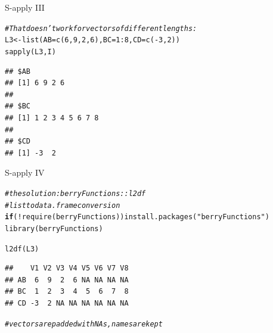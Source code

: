 \documentclass[xcolor=table,       handout,    xcolor=dvipsnames]{beamer}\usepackage[]{graphicx}\usepackage[]{color}
\makeatletter
\newcommand{\hlnum}[1]{\textcolor[rgb]{0,0,0}{#1}}
\newcommand{\hlstr}[1]{\textcolor[rgb]{0.545,0.137,0.137}{#1}}
\newcommand{\hlcom}[1]{\textcolor[rgb]{0,0.392,0}{\textit{#1}}}
\newcommand{\hlopt}[1]{\textcolor[rgb]{0,0,0}{#1}}
\newcommand{\hlstd}[1]{\textcolor[rgb]{0,0,0}{#1}}
\newcommand{\hlkwa}[1]{\textcolor[rgb]{1,0,0}{\textbf{#1}}}
\newcommand{\hlkwb}[1]{\textcolor[rgb]{0,0,0}{#1}}
\newcommand{\hlkwc}[1]{\textcolor[rgb]{1,0,1}{#1}}
\newcommand{\hlkwd}[1]{\textcolor[rgb]{0,0,1}{#1}}
\newenvironment{kframe}{%
 \def\at@end@of@kframe{}%
 \ifinner\ifhmode%
  \def\at@end@of@kframe{\end{minipage}}%
  \begin{minipage}{\columnwidth}%
 \fi\fi%
 \def\FrameCommand##1{\hskip\@totalleftmargin \hskip-\fboxsep
 \colorbox{shadecolor}{##1}\hskip-\fboxsep
     \hskip-\linewidth \hskip-\@totalleftmargin \hskip\columnwidth}%
 \MakeFramed {\advance\hsize-\width
   \@totalleftmargin\z@ \linewidth\hsize
   \@setminipage}}%
 {\par\unskip\endMakeFramed%
 \at@end@of@kframe}
\newenvironment{knitrout}{}{} %
\makeatother
\begin{document}
\begin{frame}[fragile]{S-apply III}
\begin{knitrout}
\color{fgcolor}\begin{kframe}
\begin{alltt}
\hlcom{# That doesn't work for vectors of different lengths:}
\hlstd{L3} \hlkwb{<-} \hlkwd{list}\hlstd{(}\hlkwc{AB}\hlstd{=}\hlkwd{c}\hlstd{(}\hlnum{6}\hlstd{,}\hlnum{9}\hlstd{,}\hlnum{2}\hlstd{,}\hlnum{6}\hlstd{),} \hlkwc{BC}\hlstd{=}\hlnum{1}\hlopt{:}\hlnum{8}\hlstd{,} \hlkwc{CD}\hlstd{=}\hlkwd{c}\hlstd{(}\hlopt{-}\hlnum{3}\hlstd{,}\hlnum{2}\hlstd{) )}
\hlkwd{sapply}\hlstd{(L3, I)}
\end{alltt}
\begin{verbatim}
## $AB
## [1] 6 9 2 6
## 
## $BC
## [1] 1 2 3 4 5 6 7 8
## 
## $CD
## [1] -3  2
\end{verbatim}
\end{kframe}
\end{knitrout}
\end{frame}


\begin{frame}[fragile]{S-apply IV}
\begin{knitrout}\small
{}\color{fgcolor}\begin{kframe}
\begin{alltt}
\hlcom{# the solution: berryFunctions::l2df}
\hlcom{# list to data.frame conversion}
\hlkwa{if}\hlstd{(}\hlopt{!}\hlkwd{require}\hlstd{(berryFunctions))} \hlkwd{install.packages}\hlstd{(}\hlstr{"berryFunctions"}\hlstd{)}
\hlkwd{library}\hlstd{(berryFunctions)}

\hlkwd{l2df}\hlstd{(L3)}
\end{alltt}
\begin{verbatim}
##    V1 V2 V3 V4 V5 V6 V7 V8
## AB  6  9  2  6 NA NA NA NA
## BC  1  2  3  4  5  6  7  8
## CD -3  2 NA NA NA NA NA NA
\end{verbatim}
\begin{alltt}
\hlcom{# vectors are padded with NAs, names are kept}
\end{alltt}
\end{kframe}
\end{knitrout}

\end{frame}

\end{document}
